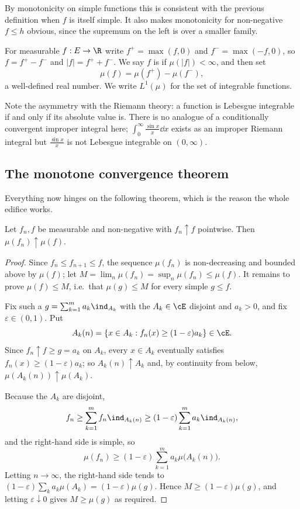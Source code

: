 By monotonicity on simple functions this is consistent with the previous definition when $f$ is itself simple. It also makes monotonicity for non-negative $f \leq h$ obvious, since the supremum on the left is over a smaller family.

\begin{definition}
	For measurable $f : E \to \R$ write $f^+ = \max(f, 0)$ and $f^- = \max(-f, 0)$, so $f = f^+ - f^-$ and $|f| = f^+ + f^-$. We say $f$ is  if $\mu(|f|) < \infty$, and then set
	$$
	\mu(f) = \mu(f^+) - \mu(f^-),
	$$
	a well-defined real number. We write $L^1(\mu)$ for the set of integrable functions.
\end{definition}

Note the asymmetry with the Riemann theory: a function is Lebesgue integrable if and only if its absolute value is. There is no analogue of a conditionally convergent improper integral here; $\int_0^\infty \frac{\sin x}{x}\dd x$ exists as an improper Riemann integral but $\frac{\sin x}{x}$ is not Lebesgue integrable on $(0,\infty)$.

\subsection{The monotone convergence theorem}

Everything now hinges on the following theorem, which is the reason the whole edifice works.

\begin{theorem}\label{pm-thm:mct}
	Let $f_n, f$ be measurable and non-negative with $f_n \uparrow f$ pointwise. Then $\mu(f_n) \uparrow \mu(f)$.
\end{theorem}
\begin{proof}
	Since $f_n \leq f_{n+1} \leq f$, the sequence $\mu(f_n)$ is non-decreasing and bounded above by $\mu(f)$; let $M = \lim_n \mu(f_n) = \sup_n \mu(f_n) \leq \mu(f)$. It remains to prove $\mu(f) \leq M$, i.e.\ that $\mu(g) \leq M$ for every simple $g \leq f$.

	Fix such a $g = \sum_{k=1}^m a_k \ind_{A_k}$ with the $A_k \in \cE$ disjoint and $a_k > 0$, and fix $\varepsilon \in (0,1)$. Put
	$$
	A_k(n) = \{ x \in A_k : f_n(x) \geq (1-\varepsilon)a_k \} \in \cE.
	$$
	Since $f_n \uparrow f \geq g = a_k$ on $A_k$, every $x \in A_k$ eventually satisfies $f_n(x) \geq (1-\varepsilon)a_k$; so $A_k(n) \uparrow A_k$ and, by continuity from below, $\mu(A_k(n)) \uparrow \mu(A_k)$.

	Because the $A_k$ are disjoint,
	$$
	f_n \geq \sum_{k=1}^m f_n \ind_{A_k(n)} \geq (1-\varepsilon)\sum_{k=1}^m a_k \ind_{A_k(n)},
	$$
	and the right-hand side is simple, so
	$$
	\mu(f_n) \geq (1-\varepsilon)\sum_{k=1}^m a_k \mu\big(A_k(n)\big).
	$$
	Letting $n \to \infty$, the right-hand side tends to $(1-\varepsilon)\sum_k a_k \mu(A_k) = (1-\varepsilon)\mu(g)$. Hence $M \geq (1-\varepsilon)\mu(g)$, and letting $\varepsilon \downarrow 0$ gives $M \geq \mu(g)$ as required.
\end{proof}

